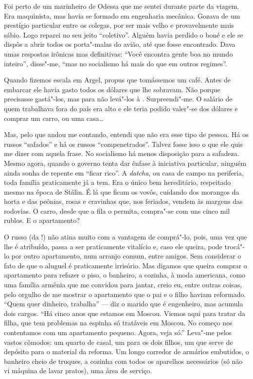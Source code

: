 Foi perto de um marinheiro de Odessa que me sentei durante parte da viagem. Era maquinista, mas havia se formado em engenharia mecânica. Gozava de um prestígio particular entre os colegas, por ser mais velho e provavelmente mais sábio. Logo reparei no seu jeito ``coletivo''. Alguém havia perdido o boné e ele se dispôs a abrir todos os porta"-malas do avião, até que fosse encontrado. Dava umas respostas irônicas mas definitivas: ``Você encontra gente boa no mundo inteiro'', disse"-me, ``mas no socialismo há mais do que em outros regimes''.

Quando fizemos escala em Argel, propus que tomássemos um café. Antes de embarcar ele havia gasto todos os dólares que lhe sobravam. Não porque precisasse gastá"-los, mas para não levá"-los à . Surpreendi"-me. O salário de quem trabalhava fora do país era alto e ele teria podido valer"-se dos dólares e comprar um carro, ou uma casa\ldots{}

Mas, pelo que andou me contando, entendi que não era esse tipo de pessoa. Há os russos ``safados'' e há os russos  ``compenetrados''. Talvez fosse isso o que ele quis me dizer com aquela frase. No socialismo há menos disposição para a safadeza. Mesmo agora, quando o governo tenta dar ênfase à iniciativa particular, ninguém ainda sonha de repente em ``ficar rico''. A \emph{datcha}, ou casa de campo na periferia, toda família praticamente já a tem. Era o único bem hereditário, respeitado mesmo na época de Stálin. É lá que ficam os vovôs, cuidando dos morangos da horta e das peônias, rosas e cravinhas que, nos feriados, vendem às margens das rodovias. O carro, desde que a fila o permita, compra"-se com uns cinco mil rublos. E o apartamento?

O russo (da !) não atina muito com a vantagem de comprá"-lo, pois, uma vez que lhe é atribuído, passa a ser praticamente vitalício e, caso ele queira, pode trocá"-lo por outro apartamento, num arranjo comum, entre amigos. Sem considerar o fato de que o aluguel é praticamente irrisório. Mas digamos que queira comprar o apartamento para refazer o piso, o banheiro, a cozinha, à moda americana, como uma família armênia que me convidou para jantar, creio eu, entre outras coisas, pelo orgulho
de me mostrar o apartamento que o pai e o filho haviam reformado. ``Quem quer dinheiro, trabalha'' --- diz o marido que é engenheiro, mas acumula dois cargos. ``Há cinco anos que estamos em Moscou. Viemos aqui para tratar da filha, que tem problemas na espinha só tratáveis em Moscou. No começo nos contentamos com um apartamento pequeno. Agora, veja só.'' Leva"-me pelos vastos cômodos: um quarto de casal, um para os dois filhos, um que serve de depósito para o material da reforma. Um longo corredor de armários embutidos, o banheiro cheio de truques, a cozinha com todos os aparelhos necessários (só não vi máquina de lavar pratos),
uma área de serviço.


